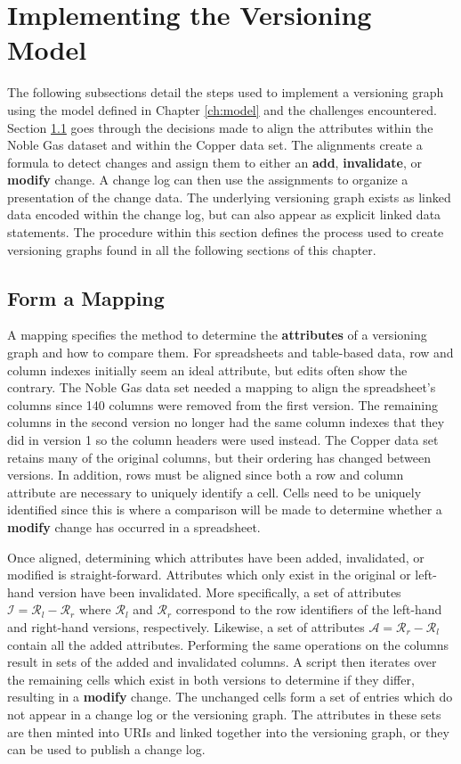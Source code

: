 \section{Implementing the Versioning Model}

The following subsections detail the steps used to implement a versioning graph using the model defined in Chapter \ref{ch:model} and the challenges encountered.
Section \ref{mapping} goes through the decisions made to align the attributes within the Noble Gas dataset and within the Copper data set.
The alignments create a formula to detect changes and assign them to either an \textbf{add}, \textbf{invalidate}, or \textbf{modify} change.
A change log can then use the assignments to organize a presentation of the change data.
The underlying versioning graph exists as linked data encoded within the change log, but can also appear as explicit linked data statements.
The procedure within this section defines the process used to create versioning graphs found in all the following sections of this chapter.

\subsection{Form a Mapping} \label{mapping}

A mapping specifies the method to determine the \textbf{attributes} of a versioning graph and how to compare them.
For spreadsheets and table-based data, row and column indexes initially seem an ideal attribute, but edits often show the contrary.
The Noble Gas data set needed a mapping to align the spreadsheet's columns since 140 columns were removed from the first version.
The remaining columns in the second version no longer had the same column indexes that they did in version 1 so the column headers were used instead.
The Copper data set retains many of the original columns, but their ordering has changed between versions.
In addition, rows must be aligned since both a row and column attribute are necessary to uniquely identify a cell.
Cells need to be uniquely identified since this is where a comparison will be made to determine whether a \textbf{modify} change has occurred in a spreadsheet.

Once aligned, determining which attributes have been added, invalidated, or modified is straight-forward.
Attributes which only exist in the original or left-hand version have been invalidated.
More specifically, a set of attributes \(\mathcal{I} = \mathcal{R}_{l} - \mathcal{R}_{r}\) where \(\mathcal{R}_{l}\) and \(\mathcal{R}_{r}\) correspond to the row identifiers of the left-hand and right-hand versions, respectively.
Likewise, a set of attributes \(\mathcal{A} = \mathcal{R}_{r} - \mathcal{R}_{l}\) contain all the added attributes.
Performing the same operations on the columns result in sets of the added and invalidated columns.
A script then iterates over the remaining cells which exist in both versions to determine if they differ, resulting in a \textbf{modify} change.
The unchanged cells form a set of entries which do not appear in a change log or the versioning graph.
The attributes in these sets are then minted into URIs and linked together into the versioning graph, or they can be used to publish a change log.

